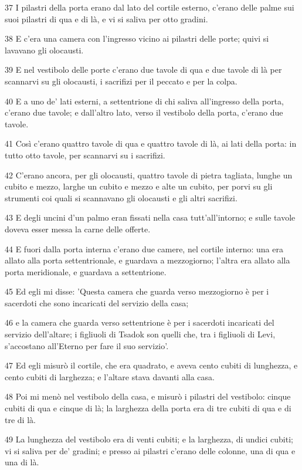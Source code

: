 \par 37 I pilastri della porta erano dal lato del cortile esterno, c'erano delle palme sui suoi pilastri di qua e di là, e vi si saliva per otto gradini.
\par 38 E c'era una camera con l'ingresso vicino ai pilastri delle porte; quivi si lavavano gli olocausti.
\par 39 E nel vestibolo delle porte c'erano due tavole di qua e due tavole di là per scannarvi su gli olocausti, i sacrifizi per il peccato e per la colpa.
\par 40 E a uno de' lati esterni, a settentrione di chi saliva all'ingresso della porta, c'erano due tavole; e dall'altro lato, verso il vestibolo della porta, c'erano due tavole.
\par 41 Così c'erano quattro tavole di qua e quattro tavole di là, ai lati della porta: in tutto otto tavole, per scannarvi su i sacrifizi.
\par 42 C'erano ancora, per gli olocausti, quattro tavole di pietra tagliata, lunghe un cubito e mezzo, larghe un cubito e mezzo e alte un cubito, per porvi su gli strumenti coi quali si scannavano gli olocausti e gli altri sacrifizi.
\par 43 E degli uncini d'un palmo eran fissati nella casa tutt'all'intorno; e sulle tavole doveva esser messa la carne delle offerte.
\par 44 E fuori dalla porta interna c'erano due camere, nel cortile interno: una era allato alla porta settentrionale, e guardava a mezzogiorno; l'altra era allato alla porta meridionale, e guardava a settentrione.
\par 45 Ed egli mi disse: 'Questa camera che guarda verso mezzogiorno è per i sacerdoti che sono incaricati del servizio della casa;
\par 46 e la camera che guarda verso settentrione è per i sacerdoti incaricati del servizio dell'altare; i figliuoli di Tsadok son quelli che, tra i figliuoli di Levi, s'accostano all'Eterno per fare il suo servizio'.
\par 47 Ed egli misurò il cortile, che era quadrato, e aveva cento cubiti di lunghezza, e cento cubiti di larghezza; e l'altare stava davanti alla casa.
\par 48 Poi mi menò nel vestibolo della casa, e misurò i pilastri del vestibolo: cinque cubiti di qua e cinque di là; la larghezza della porta era di tre cubiti di qua e di tre di là.
\par 49 La lunghezza del vestibolo era di venti cubiti; e la larghezza, di undici cubiti; vi si saliva per de' gradini; e presso ai pilastri c'erano delle colonne, una di qua e una di là.

